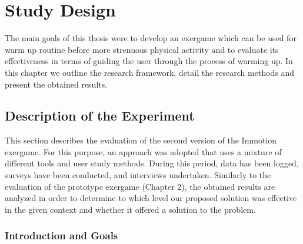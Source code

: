 \chapter{Study Design}\label{chapter:studydesign}
The main goals of this thesis were to develop an exergame which can be used for warm up routine before more strenuous physical activity and to evaluate its effectiveness in terms of guiding the user through the process of warming up. In this chapter we outline the research framework, detail the research methods and present the obtained results.
\section{Description of the Experiment}
This section describes the evaluation of the second version of the Immotion exergame. For this purpose, an approach was adopted that uses a mixture of different tools and user study methods. During this period, data has been logged, surveys have been conducted, and interviews undertaken. Similarly to the evaluation of the prototype exergame (Chapter 2), the obtained results are analyzed in order to determine to which level our proposed solution was effective in the given context and whether it offered a solution to the problem. %

\subsection{Introduction and Goals} \label{chapter:goals}

